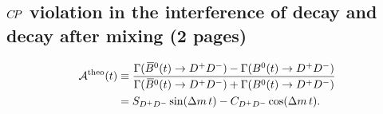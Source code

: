 
\subsection{\texorpdfstring{${C\!P}$}{CP} violation in the interference of decay and decay after mixing (2 pages)}
\label{sec:cpviolation:types:interference}

\begin{equation}
\begin{split}
  {\mathcal A}^{\text{theo}}(t) & \equiv
    \frac{\Gamma(\Bzb(t) \to \Dp\Dm) - \Gamma(\Bz(t) \to \Dp\Dm)}
         {\Gamma(\Bzb(t) \to \Dp\Dm) + \Gamma(\Bz(t) \to \Dp\Dm)}\\
   &= \SDD\sin(\dm\,t) - \CDD\cos(\dm\,t).\
\end{split}
\label{eq:cpviolation:asymmetry}
\end{equation}